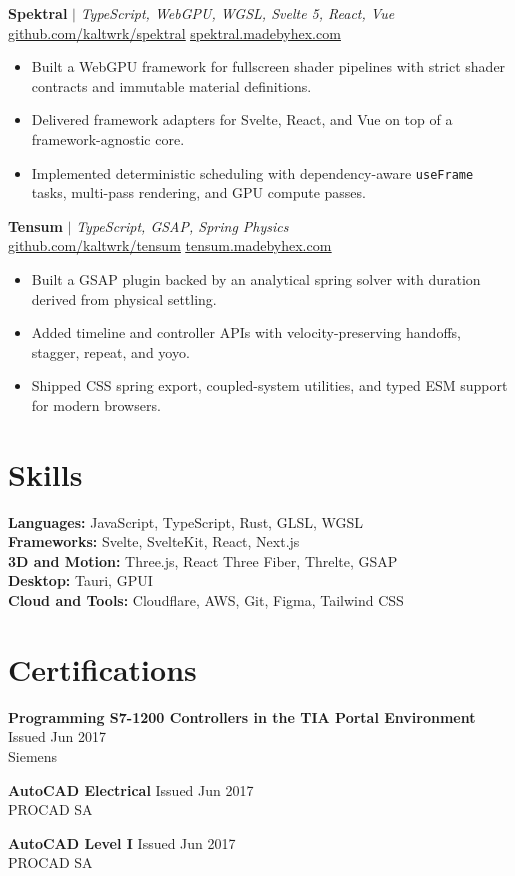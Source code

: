 \documentclass[10pt,a4paper]{article}
\let\oldhref\href
\renewcommand{\href}[2]{\oldhref{#1}{\uline{#2}}}
\begin{document}
\textbf{Spektral} $|$ \textit{TypeScript, WebGPU, WGSL, Svelte 5, React, Vue} \hfill\\
\href{https://github.com/kaltwrk/spektral}{github.com/kaltwrk/spektral} \textbar{} \href{https://www.spektral.madebyhex.com/}{spektral.madebyhex.com}
\begin{itemize}
  \item Built a WebGPU framework for fullscreen shader pipelines with strict shader contracts and immutable material definitions.
  \item Delivered framework adapters for Svelte, React, and Vue on top of a framework-agnostic core.
  \item Implemented deterministic scheduling with dependency-aware \texttt{useFrame} tasks, multi-pass rendering, and GPU compute passes.
\end{itemize}

\textbf{Tensum} $|$ \textit{TypeScript, GSAP, Spring Physics} \hfill\\
\href{https://github.com/kaltwrk/tensum}{github.com/kaltwrk/tensum} \textbar{} \href{https://tensum.madebyhex.com/}{tensum.madebyhex.com}
\begin{itemize}
  \item Built a GSAP plugin backed by an analytical spring solver with duration derived from physical settling.
  \item Added timeline and controller APIs with velocity-preserving handoffs, stagger, repeat, and yoyo.
  \item Shipped CSS spring export, coupled-system utilities, and typed ESM support for modern browsers.
\end{itemize}

\section{Skills}

\textbf{Languages:} JavaScript, TypeScript, Rust, GLSL, WGSL\\
\textbf{Frameworks:} Svelte, SvelteKit, React, Next.js\\
\textbf{3D and Motion:} Three.js, React Three Fiber, Threlte, GSAP\\
\textbf{Desktop:} Tauri, GPUI\\
\textbf{Cloud and Tools:} Cloudflare, AWS, Git, Figma, Tailwind CSS

\section{Certifications}

\textbf{Programming S7-1200 Controllers in the TIA Portal Environment} \hfill Issued Jun 2017\\
Siemens

\textbf{AutoCAD Electrical} \hfill Issued Jun 2017\\
PROCAD SA

\textbf{AutoCAD Level I} \hfill Issued Jun 2017\\
PROCAD SA
\end{document}
